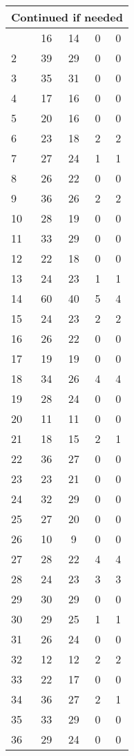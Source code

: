 \begin{center}
\begin{longtable}{l|c|c|c|c}
\hline \multicolumn{5}{|r|}{{Continued if needed}} \\ \hline
\endfoot 
1 & 16 & 14 & 0 & 0\\ \hline
2 & 39 & 29 & 0 & 0\\ \hline
3 & 35 & 31 & 0 & 0\\ \hline
4 & 17 & 16 & 0 & 0\\ \hline
5 & 20 & 16 & 0 & 0\\ \hline
6 & 23 & 18 & 2 & 2\\ \hline
7 & 27 & 24 & 1 & 1\\ \hline
8 & 26 & 22 & 0 & 0\\ \hline
9 & 36 & 26 & 2 & 2\\ \hline
10 & 28 & 19 & 0 & 0\\ \hline
11 & 33 & 29 & 0 & 0\\ \hline
12 & 22 & 18 & 0 & 0\\ \hline
13 & 24 & 23 & 1 & 1\\ \hline
14 & 60 & 40 & 5 & 4\\ \hline
15 & 24 & 23 & 2 & 2\\ \hline
16 & 26 & 22 & 0 & 0\\ \hline
17 & 19 & 19 & 0 & 0\\ \hline
18 & 34 & 26 & 4 & 4\\ \hline
19 & 28 & 24 & 0 & 0\\ \hline
20 & 11 & 11 & 0 & 0\\ \hline
21 & 18 & 15 & 2 & 1\\ \hline
22 & 36 & 27 & 0 & 0\\ \hline
23 & 23 & 21 & 0 & 0\\ \hline
24 & 32 & 29 & 0 & 0\\ \hline
25 & 27 & 20 & 0 & 0\\ \hline
26 & 10 & 9 & 0 & 0\\ \hline
27 & 28 & 22 & 4 & 4\\ \hline
28 & 24 & 23 & 3 & 3\\ \hline
29 & 30 & 29 & 0 & 0\\ \hline
30 & 29 & 25 & 1 & 1\\ \hline
31 & 26 & 24 & 0 & 0\\ \hline
32 & 12 & 12 & 2 & 2\\ \hline
33 & 22 & 17 & 0 & 0\\ \hline
34 & 36 & 27 & 2 & 1\\ \hline
35 & 33 & 29 & 0 & 0\\ \hline
36 & 29 & 24 & 0 & 0\\ \hline

\end{longtable}
\end{center}

